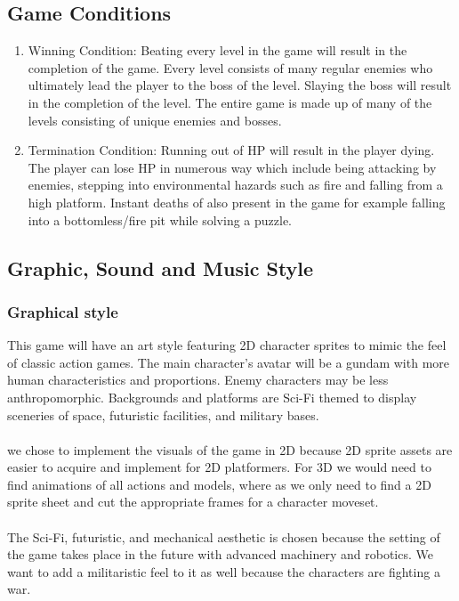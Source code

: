 \documentclass{article}
\begin{document}
\subsection*{Game Conditions}
    \begin{enumerate}
        \item Winning Condition: Beating every level in the game will result in the completion of the game.
        Every level consists of many regular enemies who ultimately lead the player to the boss of the level. Slaying the boss will result in the completion of the level. The entire game is made up of many of the levels consisting of unique enemies and bosses.
        \item Termination Condition: Running out of HP will result in the player dying. 
        The player can lose HP in numerous way which include being attacking by enemies, stepping into environmental hazards such as fire and falling from a high platform. Instant deaths of also present in the game for example falling into a bottomless/fire pit while solving a puzzle.
    \end{enumerate}

\subsection*{Graphic, Sound and Music Style}
    \subsubsection*{Graphical style}
    This game will have an art style featuring 2D character sprites to mimic the feel of classic action games. The main character’s avatar will be a gundam with more human characteristics and proportions. Enemy characters may be less anthropomorphic. Backgrounds and platforms are Sci-Fi themed to display sceneries of space, futuristic facilities, and military bases.\\\\
we chose to implement the visuals of the game in 2D because 2D sprite assets are easier to acquire and implement for 2D platformers. For 3D we would need to find animations of all actions and models, where as we only need to find a 2D sprite sheet and cut the appropriate frames for a character moveset.\\\\
The Sci-Fi, futuristic, and mechanical aesthetic is chosen because the setting of the game takes place in the future with advanced machinery and robotics. We want to add a militaristic feel to it as well because the characters are fighting a war. 
\end{document}
